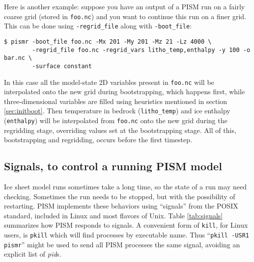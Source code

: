 Here is another example: suppose you have an output of a PISM run on a fairly
coarse grid (stored in \texttt{foo.nc}) and you want to continue this run on a
finer grid. This can be done using \texttt{-regrid_file} along with
\texttt{-boot_file}:
\begin{verbatim}
$ pismr -boot_file foo.nc -Mx 201 -My 201 -Mz 21 -Lz 4000 \
        -regrid_file foo.nc -regrid_vars litho_temp,enthalpy -y 100 -o bar.nc \
        -surface constant
\end{verbatim}
In this case all the model-state 2D variables present in \texttt{foo.nc} will
be interpolated onto the new grid during bootstrapping, which happens first,
while three-dimensional variables are filled using heuristics mentioned in
section \ref{sec:initboot}.  Then temperature in bedrock (\texttt{litho_temp}) and
ice enthalpy (\texttt{enthalpy}) will be interpolated from \texttt{foo.nc} onto the
new grid during the regridding stage, overriding values set at the
bootstrapping stage.  All of this, bootstrapping and regridding, occurs before
the first timestep.


\newcommand\pid{\textsl{pid}s}

\subsection{Signals, to control a running PISM model} \label{subsect:signal}    Ice sheet model runs sometimes take a long time, so the state of a run may need checking.  Sometimes the run needs to be stopped, but with the possibility of restarting.  PISM implements these behaviors using ``signals'' from the POSIX standard, included in Linux and most flavors of Unix.  Table \ref{tab:signals} summarizes how PISM responds to signals.  A convenient form of \texttt{kill}, for Linux users, is \texttt{pkill} which will find processes by executable name.  Thus ``\texttt{pkill -USR1 pismr}'' might be used to send all PISM processes the same signal, avoiding an explicit list of \pid.

